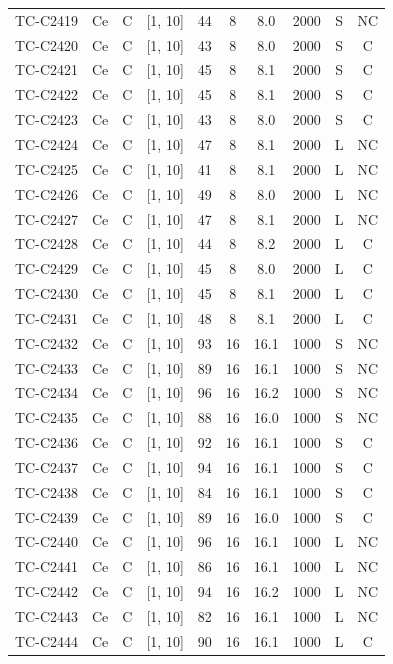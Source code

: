\begin{longtable}{lccccccccc}
TC-C2419 & Ce & C & [1, 10] & 44 & 8 & 8.0 & 2000 & S & NC \\
TC-C2420 & Ce & C & [1, 10] & 43 & 8 & 8.0 & 2000 & S & C \\
TC-C2421 & Ce & C & [1, 10] & 45 & 8 & 8.1 & 2000 & S & C \\
TC-C2422 & Ce & C & [1, 10] & 45 & 8 & 8.1 & 2000 & S & C \\
TC-C2423 & Ce & C & [1, 10] & 43 & 8 & 8.0 & 2000 & S & C \\
TC-C2424 & Ce & C & [1, 10] & 47 & 8 & 8.1 & 2000 & L & NC \\
TC-C2425 & Ce & C & [1, 10] & 41 & 8 & 8.1 & 2000 & L & NC \\
TC-C2426 & Ce & C & [1, 10] & 49 & 8 & 8.0 & 2000 & L & NC \\
TC-C2427 & Ce & C & [1, 10] & 47 & 8 & 8.1 & 2000 & L & NC \\
TC-C2428 & Ce & C & [1, 10] & 44 & 8 & 8.2 & 2000 & L & C \\
TC-C2429 & Ce & C & [1, 10] & 45 & 8 & 8.0 & 2000 & L & C \\
TC-C2430 & Ce & C & [1, 10] & 45 & 8 & 8.1 & 2000 & L & C \\
TC-C2431 & Ce & C & [1, 10] & 48 & 8 & 8.1 & 2000 & L & C \\
TC-C2432 & Ce & C & [1, 10] & 93 & 16 & 16.1 & 1000 & S & NC \\
TC-C2433 & Ce & C & [1, 10] & 89 & 16 & 16.1 & 1000 & S & NC \\
TC-C2434 & Ce & C & [1, 10] & 96 & 16 & 16.2 & 1000 & S & NC \\
TC-C2435 & Ce & C & [1, 10] & 88 & 16 & 16.0 & 1000 & S & NC \\
TC-C2436 & Ce & C & [1, 10] & 92 & 16 & 16.1 & 1000 & S & C \\
TC-C2437 & Ce & C & [1, 10] & 94 & 16 & 16.1 & 1000 & S & C \\
TC-C2438 & Ce & C & [1, 10] & 84 & 16 & 16.1 & 1000 & S & C \\
TC-C2439 & Ce & C & [1, 10] & 89 & 16 & 16.0 & 1000 & S & C \\
TC-C2440 & Ce & C & [1, 10] & 96 & 16 & 16.1 & 1000 & L & NC \\
TC-C2441 & Ce & C & [1, 10] & 86 & 16 & 16.1 & 1000 & L & NC \\
TC-C2442 & Ce & C & [1, 10] & 94 & 16 & 16.2 & 1000 & L & NC \\
TC-C2443 & Ce & C & [1, 10] & 82 & 16 & 16.1 & 1000 & L & NC \\
TC-C2444 & Ce & C & [1, 10] & 90 & 16 & 16.1 & 1000 & L & C \\

\end{longtable}
